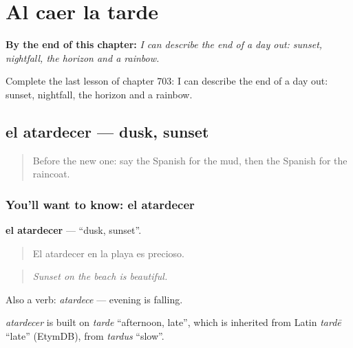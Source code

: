 
\chapter{Al caer la tarde}
\label{ch:es-al-caer-la-tarde}

\begin{chapteropening}
\textbf{By the end of this chapter:} \emph{I can describe the end of a day out: sunset, nightfall, the horizon and a rainbow.}

Complete the last lesson of chapter 703: I can describe the end of a day out: sunset, nightfall, the horizon and a rainbow.
\end{chapteropening}

\section[el atardecer]{el atardecer — dusk, sunset}

\label{lesson:ES-C703-atardecer}



\begin{quote}
Before the new one: say the Spanish for the mud, then the Spanish for the raincoat.
\end{quote}

\subsection*{You'll want to know: el atardecer}
\textbf{el atardecer} — \textquotedblleft{}dusk, sunset\textquotedblright{}.

\begin{quote}
El atardecer en la playa es precioso.
\end{quote}

\begin{quote}
\emph{Sunset on the beach is beautiful.}
\end{quote}

Also a verb: \emph{atardece} — evening is falling.

\begin{cousinweb}
\emph{atardecer} is built on \emph{tarde} \textquotedblleft{}afternoon, late\textquotedblright{}, which is inherited from Latin \emph{tardē} \textquotedblleft{}late\textquotedblright{} (EtymDB), from \emph{tardus} \textquotedblleft{}slow\textquotedblright{}.
\end{cousinweb}


